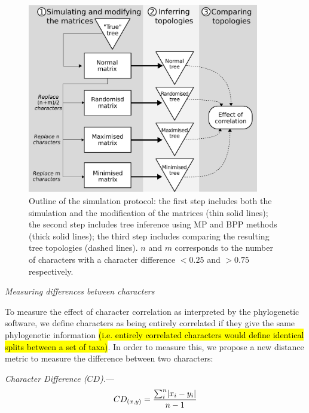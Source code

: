 \documentclass[12pt,letterpaper]{article}
\DeclarePairedDelimiter\abs{\lvert}{\rvert}%
\renewcommand{\subsection}[1]{%
\bigskip
\begin{center}
\begin{large}
\normalfont\itshape #1
\end{large}
\end{center}}
\renewcommand{\subsubsection}[1]{%
\vspace{2ex}
\noindent
\textit{#1.}---}
\begin{document}
\begin{figure}[!htbp]
\centering
   \includegraphics[width=0.9\textwidth]{Figures/outline.pdf}
\caption{Outline of the simulation protocol: the first step includes both the simulation and the modification of the matrices (thin solid lines); the second step includes tree inference using MP and BPP methods (thick solid lines); the third step includes comparing the resulting tree topologies (dashed lines). $n$ and $m$ corresponds to the number of characters with a character difference $<0.25$ and $>0.75$ respectively.}
\label{Fig:outline}
\end{figure}

\subsection{Measuring differences between characters}
\label{CDdescription}
To measure the effect of character correlation as interpreted by the phylogenetic software, we define characters as being entirely correlated if they give the same phylogenetic information \hl{(i.e. entirely correlated characters would define identical splits between a set of taxa)}.
In order to measure this, we propose a new distance metric to measure the difference between two characters:

\subsubsection{Character Difference ($CD$)}
\begin{equation}
    CD_{(x,y)} = \frac{\sum_{i}^{n}\abs{x_{i} - y_{i}}}{n-1}
\end{equation}
\end{document}
